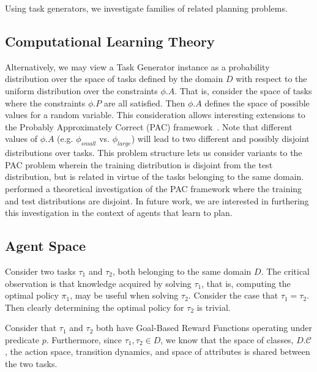 \documentclass[11pt]{article}
\begin{document}
Using task generators, we investigate families of related planning problems. 

\subsection{Computational Learning Theory}
Alternatively, we may view a Task Generator instance as a probability distribution over the space of tasks defined by the domain $D$ with respect to the uniform distribution over the constraints $\phi.A$. That is, consider the space of tasks where the constraints $\phi.P$ are all satisfied. Then $\phi.A$ defines the space of possible values for a random variable. This consideration allows interesting extensions to the Probably Approximately Correct (PAC) framework~\cite{valiant1984theory}. Note that different values of $\phi.A$ (e.g. $\phi_{small}$ vs. $\phi_{large}$) will lead to two different and possibly disjoint distributions over tasks. This problem structure lets us consider variants to the PAC problem wherein the training distribution is disjoint from the test distribution, but is related in virtue of the tasks belonging to the same domain. ~\cite{baxter2000model} performed a theoretical investigation of the PAC framework where the training and test distributions are disjoint. In future work, we are interested in furthering this investigation in the context of agents that learn to plan.

\subsection{Agent Space}
Consider two tasks $\tau_1$ and $\tau_2$, both belonging to the same domain $D$. The critical observation is that knowledge acquired by solving $\tau_1$, that is, computing the optimal policy $\pi_1$, may be useful when solving $\tau_2$. Consider the case that $\tau_1 = \tau_2$. Then clearly determining the optimal policy for $\tau_2$ is trivial.

Consider that $\tau_1$ and $\tau_2$ both have Goal-Based Reward Functions operating under predicate $p$. Furthermore, since $\tau_1, \tau_2 \in D$, we know that the space of classes, $D.\mathcal{C}$, the action space, transition dynamics, and space of attributes is shared between the two tasks.
\end{document}
